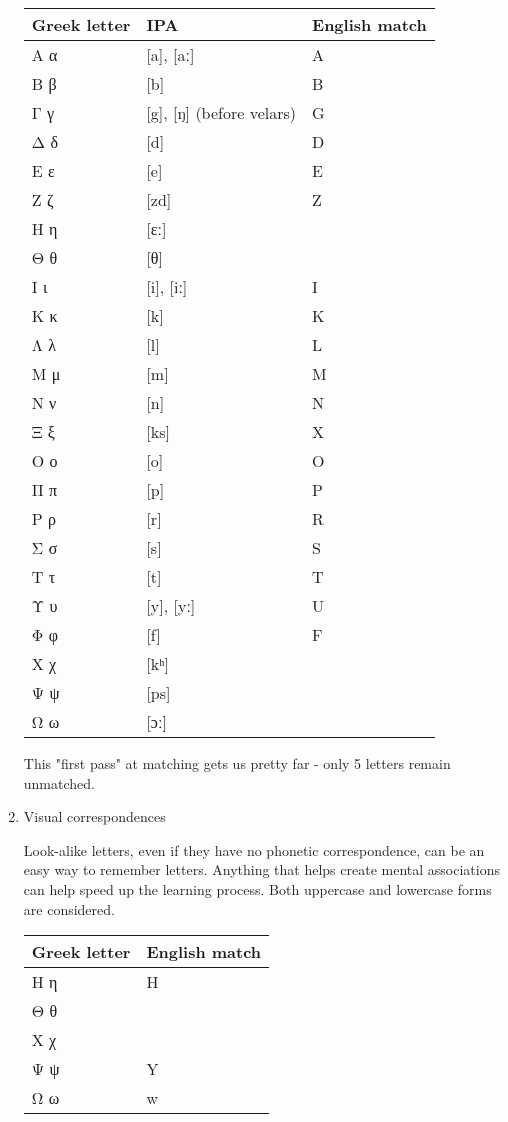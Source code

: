 \documentclass[11pt]{article}
\begin{document}
\begin{enumerate}
\begin{center}
\begin{tabular}{lll}
Greek letter & IPA & English match\\
\hline
Α α & [a], [aː] & A\\
Β β & [b] & B\\
Γ γ & [g], [ŋ] (before velars) & G\\
Δ δ & [d] & D\\
Ε ε & [e] & E\\
Ζ ζ & [zd] & Z\\
Η η & [ɛː] & \\
Θ θ & [θ] & \\
Ι ι & [i], [iː] & I\\
Κ κ & [k] & K\\
Λ λ & [l] & L\\
Μ μ & [m] & M\\
Ν ν & [n] & N\\
Ξ ξ & [ks] & X\\
Ο ο & [o] & O\\
Π π & [p] & P\\
Ρ ρ & [r] & R\\
Σ σ & [s] & S\\
Τ τ & [t] & T\\
Υ υ & [y], [yː] & U\\
Φ φ & [f] & F\\
Χ χ & [kʰ] & \\
Ψ ψ & [ps] & \\
Ω ω & [ɔː] & \\
\end{tabular}
\end{center}

This "first pass" at matching gets us pretty far - only 5 letters remain unmatched.

\item Visual correspondences
\label{sec:orgeb6e49d}

Look-alike letters, even if they have no phonetic correspondence, can be an easy way to remember letters. Anything that helps create mental associations can help speed up the learning process. Both uppercase and lowercase forms are considered.

\begin{center}
\begin{tabular}{ll}
Greek letter & English match\\
\hline
Η η & H\\
Θ θ & \\
Χ χ & \\
Ψ ψ & Y\\
Ω ω & w\\
\end{tabular}
\end{center}


\end{enumerate}
\end{document}
